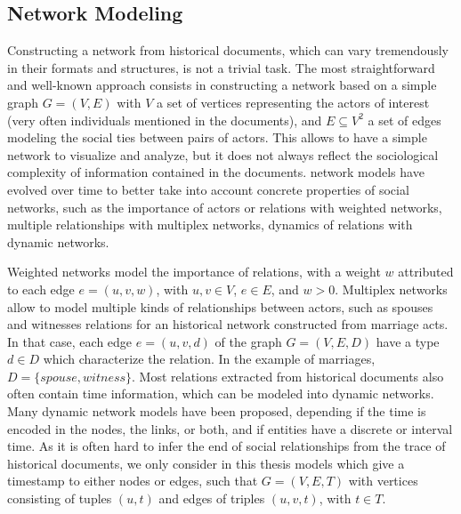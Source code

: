

\subsection{Network Modeling}

Constructing a network from historical documents, which can vary tremendously in their formats and structures, is not a trivial task\cite{alkadi2022}.
The most straightforward and well-known approach consists in constructing a network based on a simple graph $G = (V, E)$ with $V$ a set of vertices representing the actors of interest (very often individuals mentioned in the documents), and $E \subseteq V^2$ a set of edges modeling the social ties between pairs of actors.
This allows to have a simple network to visualize and analyze, but it does not always reflect the sociological complexity of information contained in the documents.
\hsna network models have evolved over time to better take into account concrete properties of social networks, such as the importance of actors or relations with weighted networks, multiple relationships with multiplex networks, dynamics of relations with dynamic networks.

Weighted networks model the importance of relations, with a weight $w$ attributed to each edge $e = (u, v, w)$, with $u, v \in V$, $e \in E$, and $w > 0$.
Multiplex networks allow to model multiple kinds of relationships between actors, such as spouses and witnesses relations for an historical network constructed from marriage acts.
In that case, each edge $e = (u, v, d)$ of the graph $G = (V, E, D)$ have a type $d \in D$ which characterize the relation.
In the example of marriages, $D = \{spouse, witness\}$.
Most relations extracted from historical documents also often contain time information, which can be modeled into dynamic networks.
Many dynamic network models have been proposed\cite{rossettiCommunityDiscoveryDynamic2018}, depending if the time is encoded in the nodes, the links, or both, and if entities have a discrete or interval time.
As it is often hard to infer the end of social relationships from the trace of historical documents, we only consider in this thesis models which give a timestamp to either nodes or edges, such that $G = (V, E, T)$ with vertices consisting of tuples $(u, t)$ and edges of triples $(u, v, t)$, with $t \in T$.

